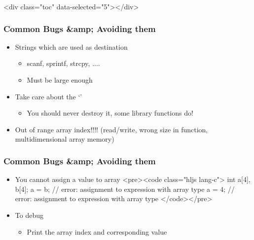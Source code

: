 \documentclass{../c-lecture}
\begin{document}
\begin{frame}
  <div class="toc" data-selected="5"></div>
\end{frame}
\begin{frame}
  \begin{frame}
    \frametitle{Common Bugs &amp; Avoiding them}
    \begin{itemize}
      \item Strings which are used as destination
      \begin{itemize}
        \item scanf, sprintf, strcpy, ....
        \item Must be large enough
      \end{itemize}
      \item Take care about the ‘\0’
      \begin{itemize}
        \item You should never destroy it, some library functions do!
      \end{itemize}
      \item
        Out of range array index!!!! (read/write, wrong size in function,
        multidimensional array memory)

    \end{itemize}
  \end{frame}
  \begin{frame}
    \frametitle{Common Bugs &amp; Avoiding them}
    \begin{itemize}
      \item You cannot assign a value to array
      <pre><code class="hljs lang-c">
int a[4], b[4];
a = b; // error: assignment to expression with array type
a = 4; // error: assignment to expression with array type
      </code></pre>
      \item To debug
      \begin{itemize}
        \item Print the array index and corresponding value
      \end{itemize}
    \end{itemize}
  \end{frame}
\end{frame}
\end{document}
